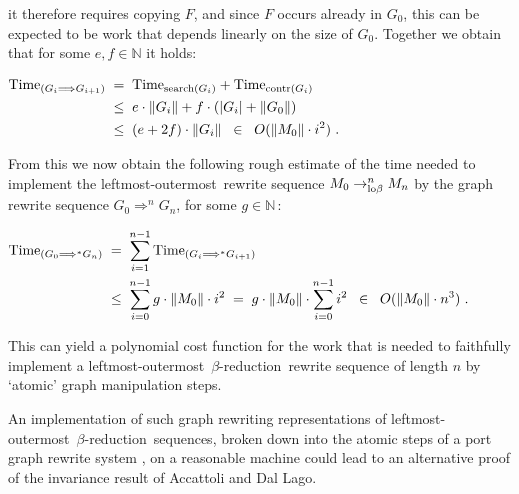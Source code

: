 \documentclass[
submission
]{dmtcs-episciences-tampered}
\newcommand{\fap}[2]{#1({#2})}
\newcommand{\iap}[2]{#1 _{#2}}
\newcommand{\indap}[2]{#1 _{#2}}
\newcommand{\subap}[2]{#1 _{#2}}
\newcommand{\supap}[2]{#1 ^{#2}}
\newcommand{\bap}{\subap}
\newcommand{\pap}{\supap}
\newcommand{\bpap}[3]{#1 _{#2}^{#3}}
\newcommand{\nb}{\nobreakdash}
\newcommand{\nf}{\normalfont}
\newcommand{\punc}[1]{\ensuremath{\hspace*{3pt}{#1}}}
\newcommand{\nat}{\mathbb{N}}
\newcommand{\sbigOmicron}{O}
\newcommand{\bigOmicron}{\fap{\sbigOmicron}}
\newcommand{\afoscopecxt}{F}
\newcommand{\sdepth}{\text{\nf d}}
\newcommand{\depth}[1]{\lvert{#1}\rvert} \newcommand{\depthbig}[1]{\big\lvert{#1}\big\rvert} \newcommand{\sudepth}{\indap{\sdepth}{\text{\nf u}}}
\newcommand{\size}[1]{\left\lVert{#1}\right\rVert}
\newcommand{\alter}{M}
\newcommand{\alteri}{\indap{\alter}}
\newcommand{\sred}{\to}
\newcommand{\sredin}[2]{\bpap{\sred}{#1}{#2}}
\newcommand{\scriptsearch}{\text{\nf search}}
\newcommand{\scriptcontract}{\text{\nf contr}}
\newcommand{\scriptlobeta}{\text{\nf lo}\beta}
\newcommand{\slobetaredn}{\sredin{\scriptlobeta}}
\newcommand{\lobetaredn}[1]{\mathrel{\slobetaredn{#1}}}
\newcommand{\betareduction}{$\beta$\nb-re\-duc\-tion}
\newcommand{\lo}{left\-most-outer\-most}
\newcommand{\agraph}{G}
\newcommand{\agraphi}{\iap{\agraph}}
\newcommand{\sgraphred}{{\Longrightarrow}}
\newcommand{\graphred}{\mathrel{\sgraphred}}
\newcommand{\sgraphredrtc}{{\Longrightarrow^*}}
\newcommand{\graphredrtc}{\mathrel{\sgraphredrtc}}
\newcommand{\sgraphredn}[1]{{\pap{\sgraphred}{#1}}}
\newcommand{\graphredn}[1]{\mathrel{\sgraphredn{#1}}}
\newcommand{\stime}{\text{\nf Time}}
\newcommand{\timei}{\bap{\stime}}
\theoremstyle{plain}
\theoremstyle{definition}
\begin{document}
it therefore requires copying $\afoscopecxt$, and since $\afoscopecxt$ occurs already in $\agraphi{0}$,
this can be expected to be work that depends linearly on the size of $\agraphi{0}$.
Together we obtain that for some $e,f\in\nat$ it holds: 
\begin{center}
  $
  \begin{aligned}
    \timei{(\agraphi{i} \graphred \agraphi{i+1})}
      & \; = \;
    \timei{\fap{\scriptsearch}{\agraphi{i}}}
      +
    \timei{\fap{\scriptcontract}{\agraphi{i}}}
    \\
      & \; \le \;
    e \cdot \size{\agraphi{i}}
      +
    f \cdot ( \depth{\agraphi{i}} + \size{\agraphi{0}} )
    \\
      & \; \le \;
    (e + 2 f) \cdot \size{\agraphi{i}}
    \;\; \in \;\; \bigOmicron{ \size{\alteri{0}} \cdot i^2 } \punc{.}
  \end{aligned}
  $
\end{center}
From this we now obtain the following rough estimate of the time needed to implement 
the \lo\ rewrite sequence $\alteri{0} \lobetaredn{n} \alteri{n}$ 
by the graph rewrite sequence $\agraphi{0} \graphredn{n} \agraphi{n}$, for some $g\in\nat\,$:
\begin{center}
  $
  \begin{aligned}
    \timei{(\agraphi{0} \graphredrtc \agraphi{n})}
      \; & {} = \;
    \sum_{i=1}^{n-1}   
        \timei{(\agraphi{i} \graphredrtc \agraphi{i+1})}
    \\    
      \; & {} \le \;
    \sum_{i=0}^{n-1}
        g \cdot \size{\alteri{0}} \cdot i^2 
      \; = \;
    g \cdot \size{\alteri{0}} \cdot  \sum_{i=0}^{n-1} i^2
    \;\; \in \;\; \bigOmicron{ \size{\alteri{0}} \cdot n^3 } \punc{.}
  \end{aligned}
  $
\end{center}
This can yield a polynomial cost function for the work that is needed
to faithfully implement a \lo\ \betareduction\ rewrite sequence of length $n$
by `atomic' graph manipulation steps. 

An implementation of such graph rewriting representations of \lo\ \betareduction\ sequences,
broken down into the atomic steps of a port graph rewrite system \cite{stew:2002}, on a reasonable machine
could lead to an alternative proof of the invariance result of Accattoli and Dal Lago. 



\enlargethispage{6ex}
\end{document}
